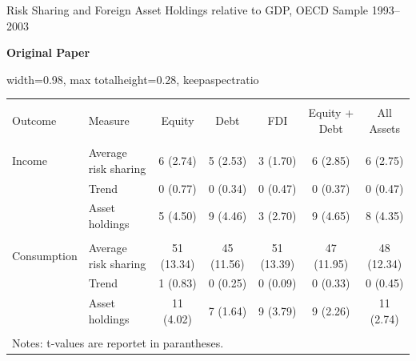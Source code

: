 \documentclass[aspectratio=169, 10pt]{beamer}
\begin{document}
\begin{frame}[t]{Risk Sharing and Foreign Asset Holdings relative to GDP, OECD Sample 1993--2003}
\centering

\begingroup
\tiny
\setlength{\tabcolsep}{1pt}
\renewcommand{\arraystretch}{0.62}

\vspace{0.03cm}

{\scriptsize \textbf{Original Paper}}

\vspace{0.04cm}

\begin{adjustbox}{
  width=0.98\textwidth,
  max totalheight=0.28\textheight,
  keepaspectratio
}
  \begin{tabular}{@{\extracolsep{3pt}}llccccc}
  \\[-1.8ex]\hline
  \hline \\[-1.8ex]
  Outcome 
  & Measure
  & Equity 
  & Debt 
  & FDI 
  & Equity + Debt 
  & All Assets \\
  \hline \\[-1.8ex]

  Income
  & Average risk sharing 
  & 6 (2.74)
  & 5 (2.53)
  & 3 (1.70)
  & 6 (2.85)
  & 6 (2.75) \\

  & Trend 
  & 0 (0.77)
  & 0 (0.34)
  & 0 (0.47)
  & 0 (0.37)
  & 0 (0.47) \\

  & Asset holdings 
  & 5 (4.50)
  & 9 (4.46)
  & 3 (2.70)
  & 9 (4.65)
  & 8 (4.35) \\

  \hline \\[-1.8ex]

  Consumption
  & Average risk sharing 
  & 51 (13.34)
  & 45 (11.56)
  & 51 (13.39)
  & 47 (11.95)
  & 48 (12.34) \\

  & Trend 
  & 1 (0.83)
  & 0 (0.25)
  & 0 (0.09)
  & 0 (0.33)
  & 0 (0.45) \\

  & Asset holdings 
  & 11 (4.02)
  & 7 (1.64)
  & 9 (3.79)
  & 9 (2.26)
  & 11 (2.74) \\

  \hline \\[-1.8ex]
  \multicolumn{7}{l}{\footnotesize Notes: t-values are reportet in parantheses.} \\
  \end{tabular}
\end{adjustbox}


\end{frame}
\end{document}
